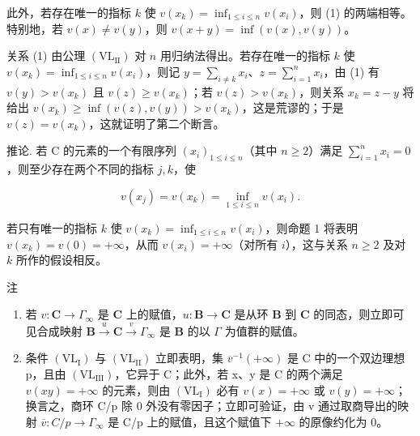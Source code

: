 此外，若存在唯一的指标 \(k\) 使 \(v(x_k) = \inf_{1 \leqslant i \leqslant n} v(x_i)\)，则 (1) 的两端相等。特别地，若 \(v(x) \neq v(y)\)，则 \(v(x + y) = \inf(v(x), v(y))\)。

关系 (1) 由公理 \((\mathrm{VL}_{\mathrm{II}})\) 对 \(n\) 用归纳法得出。若存在唯一的指标 \(k\) 使 \(v(x_k) = \inf_{1 \leqslant i \leqslant n} v(x_i)\)，则记 \(y = \sum_{i \neq k} x_i\)、\(z = \sum_{i=1}^{n} x_i\)，由 (1) 有 \(v(y) > v(x_k)\) 且 \(v(z) \geqslant v(x_k)\)；若 \(v(z) > v(x_k)\)，则关系 \(x_k = z - y\) 将给出 \(v(x_k) \geqslant \inf(v(z), v(y)) > v(x_k)\)，这是荒谬的；于是 \(v(z) = v(x_k)\)，这就证明了第二个断言。

推论. 若 C 的元素的一个有限序列 \((x_{i})_{1\leqslant i\leqslant n}\)（其中 \(n\geqslant 2\)）满足 \(\sum_{i = 1}^{n}x_{i} = 0\)，则至少存在两个不同的指标 \(j,k\)，使

\[
v (x _ {j}) = v (x _ {k}) = \inf _ {1 \leqslant i \leqslant n} v (x _ {i}).
\]

若只有唯一的指标 \(k\) 使 \(v(x_k) = \inf_{1 \leqslant i \leqslant n} v(x_i)\)，则命题 1 将表明 \(v(x_k) = v(0) = +\infty\)，从而 \(v(x_i) = +\infty\)（对所有 \(i\)），这与关系 \(n \geqslant 2\) 及对 \(k\) 所作的假设相反。

注

\begin{enumerate}
\def\labelenumi{(\arabic{enumi})}
\item
  若 \(v: \mathbf{C} \to \Gamma_{\infty}\) 是 \(\mathbf{C}\) 上的赋值，\(u: \mathbf{B} \to \mathbf{C}\) 是从环 \(\mathbf{B}\) 到 \(\mathbf{C}\) 的同态，则立即可见合成映射 \(\mathbf{B} \xrightarrow{u} \mathbf{C} \xrightarrow{v} \Gamma_{\infty}\) 是 \(\mathbf{B}\) 的以 \(\Gamma\) 为值群的赋值。
\item
  条件 \((\mathrm{VL}_{\mathrm{I}})\) 与 \((\mathrm{VL}_{\mathrm{II}})\) 立即表明，集 \(\overline{v}^{-1}(+\infty)\) 是 C 中的一个双边理想 p，且由 \((\mathrm{VL}_{\mathrm{III}})\)，它异于 C；此外，若 x、y 是 C 的两个满足 \(v(xy)=+\infty\) 的元素，则由 \((\mathrm{VL}_{\mathrm{I}})\) 必有 \(v(x)=+\infty\) 或 \(v(y)=+\infty\)；换言之，商环 C/p 除 0 外没有零因子；立即可验证，由 v 通过取商导出的映射 \(\overline{v}:C/p\to\Gamma_{\infty}\) 是 C/p 上的赋值，且这个赋值下 \(+\infty\) 的原像约化为 0。
\end{enumerate}

